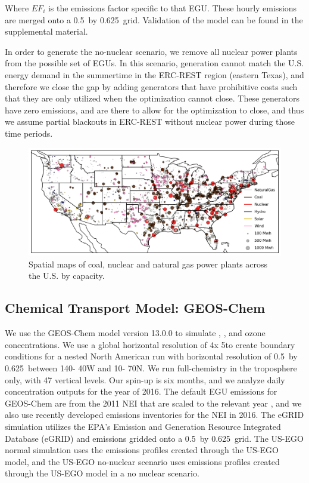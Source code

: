 \documentclass[journal=jacsat,manuscript=article]{achemso}
\begin{document}
Where $EF_i$ is the emissions factor specific to that EGU. These hourly emissions are merged onto a 0.5\textdegree~by 0.625\textdegree~grid. Validation of the model can be found in the supplemental material.

In order to generate the no-nuclear scenario, we remove all nuclear power plants from the possible set of EGUs. In this scenario, generation cannot match the U.S. energy demand in the summertime in the ERC-REST region (eastern Texas), and therefore we close the gap by adding generators that have prohibitive costs such that they are only utilized when the optimization cannot close. These generators have zero emissions, and are there to allow for the optimization to close, and thus we assume partial blackouts in ERC-REST  without nuclear power during those time periods. 

\begin{figure}
    \centering
    \includegraphics[width=1.\textwidth]{ego_nonuclear_project/Figures/plants_normal.png}
    \caption{Spatial maps of coal, nuclear and natural gas power plants across the U.S. by capacity.} 
    \label{fig:plants}
\end{figure}

\subsection{Chemical Transport Model: GEOS-Chem}
We use the GEOS-Chem model version 13.0.0 \citep{bey_global_2001} to simulate , ,  and ozone concentrations. We use a global horizontal resolution of 4\textdegree x 5\textdegree to create boundary conditions for a nested North American run with horizontal resolution of 0.5\textdegree~by 0.625\textdegree~between 140\textdegree - 40\textdegree W and 10\textdegree - 70\textdegree N. We run full-chemistry in the troposphere only, with 47 vertical levels. Our spin-up is six months, and we analyze daily concentration outputs for the year of 2016. The default EGU emissions for GEOS-Chem are from the 2011 NEI that are scaled to the relevant year \citep{geos-chem_epanei11_2019}, and we also use recently developed emissions inventories for the NEI in 2016. The eGRID simulation utilizes the EPA's Emission and Generation Resource Integrated Database (eGRID) \citep{epa_emissions_2016}  and  emissions gridded onto a 0.5\textdegree~by 0.625\textdegree~grid. The US-EGO normal simulation uses the emissions profiles created through the US-EGO model, and the US-EGO no-nuclear scenario uses emissions profiles created through the US-EGO model in a no nuclear scenario. 
\end{document}
